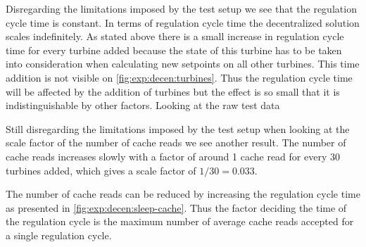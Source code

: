 Disregarding the limitations imposed by the test setup we see that the regulation cycle time is constant. In terms of regulation cycle time the decentralized solution scales indefinitely. As stated above there is a small increase in regulation cycle time for every turbine added because the state of this turbine has to be taken into consideration when calculating new setpoints on all other turbines. This time addition is not visible on \cref{fig:exp:decen:turbines}. Thus the regulation cycle time will be affected by the addition of turbines but the effect is so small that it is indistinguishable by other factors. Looking at the raw test data 

Still disregarding the limitations imposed by the test setup when looking at the scale factor of the number of cache reads we see another result. The number of cache reads increases slowly with a factor of around 1 cache read for every 30 turbines added, which gives a scale factor of $1 / 30 = 0.033$.

The number of cache reads can be reduced by increasing the regulation cycle time as presented in \cref{fig:exp:decen:sleep-cache}.
Thus the factor deciding the time of the regulation cycle is the maximum number of average cache reads accepted for a single regulation cycle.

